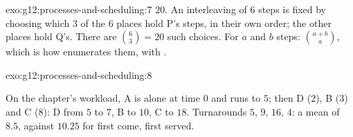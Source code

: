 \begin{solution}{exo:g12:processes-and-scheduling:7}
$20$. An interleaving of $6$ steps is fixed by choosing which $3$ of the $6$ places hold P's steps, in their own
order; the other places hold Q's. There are $\binom{6}{3} = 20$ such choices. For $a$ and $b$ steps:
$\binom{a+b}{a}$, which is how  enumerates them, with .
\end{solution}

\begin{solution}{exo:g12:processes-and-scheduling:8}
\smallskip\noindent\hspace*{2em}

\noindent\hspace*{4em}

\noindent\hspace*{4em}

\noindent\hspace*{6em}

\noindent\hspace*{6em}

\noindent\hspace*{8em}

\noindent\hspace*{8em}

\noindent\hspace*{6em}

\noindent\hspace*{6em}

\noindent\hspace*{6em}

\noindent\hspace*{6em}

\noindent\hspace*{4em}

\smallskip\noindent On the chapter's workload, A is alone at time $0$ and runs to $5$; then D ($2$), B ($3$) and C
($8$): D from $5$ to $7$, B to $10$, C to $18$. Turnarounds $5$, $9$, $16$, $4$: a mean of $8.5$, against $10.25$ for
first come, first served.
\end{solution}

